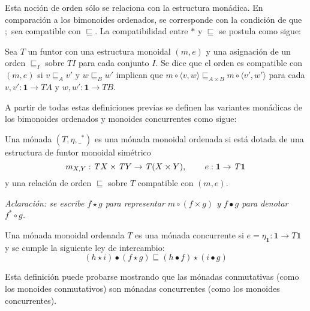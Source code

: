 Esta noción de orden sólo se relaciona con la estructura monádica. En comparación a los bimonoides ordenados, se corresponde con la condición de que $;$ sea compatible con $\sqsubseteq$. La compatibilidad entre $*$ y $\sqsubseteq$ se postula como sigue:

\begin{definition}
Sea $\mathit{T}$ un funtor con una estructura monoidal $(m,e)$ y una asignación de un orden $\sqsubseteq_I$ sobre $\mathit{T} I$ para cada conjunto $I$. Se dice que el orden es compatible con $(m,e)$ si $v \sqsubseteq_A v'$ y $w \sqsubseteq_B w'$ implican que $m \circ \langle v,w \rangle \sqsubseteq_{A \times B} m \circ \langle v',w' \rangle$ para cada $v,v' : \mathbf{1} \rightarrow \mathit{T} A$ y $w,w' : \mathbf{1} \rightarrow \mathit{T} B$. 
\end{definition}

A partir de todas estas definiciones previas se definen las variantes monádicas de los bimonoides ordenados y monoides concurrentes como sigue:

\begin{definition}\label{def:monmonord}
Una mónada $(\mathit{T},\eta,\_^*)$ es una mónada monoidal ordenada si está dotada de una estructura de funtor monoidal simétrico 
\begin{equation*}
m_{X,Y} : \mathit{T} X \times \mathit{T} Y \rightarrow \mathit{T} (X \times Y) \text{, \qquad} e : \mathbf{1} \rightarrow \mathit{T} \mathbf{1} 
\end{equation*}
y una relación de orden $\sqsubseteq$ sobre $\mathit{T}$ compatible con $(m,e)$.
\end{definition}

\textit{Aclaración: se escribe $f \star g$ para representar $m \circ (f \times g)$ y $f \bullet g$ para denotar $f^* \circ g$.}

\begin{definition}\label{def:monconc}
Una mónada monoidal ordenada $\mathit{T}$ es una mónada concurrente si $e = \eta_{\mathbf{1}} : \mathbf{1} \rightarrow \mathit{T} \mathbf{1}$ y se cumple la siguiente ley de intercambio:
\begin{equation*}
(h \star i) \bullet (f \star g) \sqsubseteq (h \bullet f) \star (i \bullet g)
\end{equation*}
\end{definition}

Esta definición puede probarse mostrando que las mónadas conmutativas (como los monoides conmutativos) son mónadas concurrentes (como los monoides concurrentes). 

